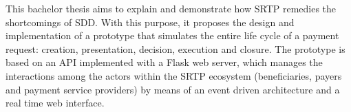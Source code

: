 This bachelor thesis aims to explain and demonstrate how SRTP remedies the shortcomings of SDD. With this purpose, it proposes the design and implementation of a prototype that simulates the entire life cycle of a payment request: creation, presentation, decision, execution and closure. The prototype is based on an API implemented with a Flask web server, which manages the interactions among the actors within the SRTP ecosystem (beneficiaries, payers and payment service providers) by means of an event driven architecture and a real time web interface.
